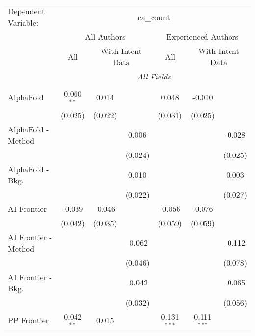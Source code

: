 \begingroup
\centering
\begin{tabular}{lcccccc}
   \tabularnewline \midrule \midrule
   Dependent Variable: & \multicolumn{6}{c}{ca\_count}\\
 & \multicolumn{3}{c}{All Authors} & \multicolumn{3}{c}{Experienced Authors} \\
\cmidrule(lr){2-4} \cmidrule(lr){5-7}
 & \multicolumn{1}{c}{All} & \multicolumn{2}{c}{With Intent Data} & \multicolumn{1}{c}{All} & \multicolumn{2}{c}{With Intent Data} \\
\cmidrule(lr){2-2} \cmidrule(lr){3-4} \cmidrule(lr){5-5} \cmidrule(lr){6-7}
 & \multicolumn{6}{c}{\textit{All Fields}} \\ \\
   AlphaFold            & 0.060$^{**}$ & 0.014   &         & 0.048         & -0.010        &   \\   
                        & (0.025)      & (0.022) &         & (0.031)       & (0.025)       &   \\   
   AlphaFold - Method   &              &         & 0.006   &               &               & -0.028\\   
                        &              &         & (0.024) &               &               & (0.025)\\   
   AlphaFold - Bkg.     &              &         & 0.010   &               &               & 0.003\\   
                        &              &         & (0.022) &               &               & (0.027)\\   
   AI Frontier          & -0.039       & -0.046  &         & -0.056        & -0.076        &   \\   
                        & (0.042)      & (0.035) &         & (0.059)       & (0.059)       &   \\   
   AI Frontier - Method &              &         & -0.062  &               &               & -0.112\\   
                        &              &         & (0.046) &               &               & (0.078)\\   
   AI Frontier - Bkg.   &              &         & -0.042  &               &               & -0.065\\   
                        &              &         & (0.032) &               &               & (0.056)\\   
   PP Frontier          & 0.042$^{**}$ & 0.015   &         & 0.131$^{***}$ & 0.111$^{***}$ &   \\   

\end{tabular}
